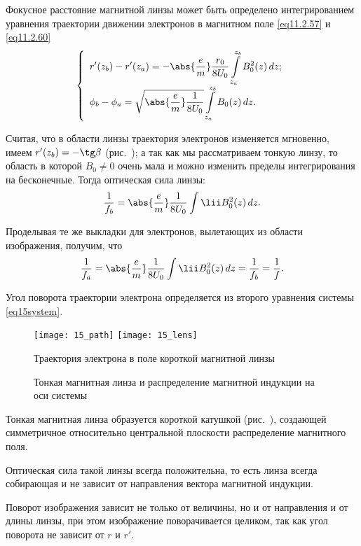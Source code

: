 
Фокусное расстояние магнитной линзы может быть определено интегрированием
уравнения траектории движении электронов в магнитном поле \eqref{eq11.2.57} и
\eqref{eq11.2.60}
\begin{equation}
  \left\{
    \begin{array}{l}
      \displaystyle r'(z_b) - r'(z_a) = -\abs{\frac{e}{m}}\frac{r_0}{8U_0}
        \int\limits_{z_a}^{z_b} B_0^2(z)\,dz; \\
      \displaystyle \phi_b - \phi_a = \sqrt{\abs{\frac{e}{m}}\frac{1}{8U_0}}
        \int\limits_{z_a}^{z_b} B_0(z)\,dz.
    \end{array}
  \right.
  \label{eq15system}
\end{equation}

Считая, что в области линзы траектория электронов изменяется мгновенно, имеем
\( r'(z_b) = -\tg\beta \) (рис.~); а так как мы рассматриваем тонкую
линзу, то область в которой \( B_0 \ne 0 \) очень мала и можно изменить пределы
интегрирования на бесконечные. Тогда оптическая сила линзы:
\[
  \frac{1}{f_b} = \abs{\frac{e}{m}}\frac{1}{8U_0} \int\lii B_0^2(z)\,dz.
\]

Проделывая те же выкладки для электронов, вылетающих из области изображения,
получим, что
\[
  \frac{1}{f_a} = \abs{\frac{e}{m}}\frac{1}{8U_0} \int\lii B_0^2(z)\,dz =
    \frac{1}{f_b} = \frac{1}{f}.
\]

Угол поворота траектории электрона определяется из второго уравнения системы
\eqref{eq15system}.

\begin{figure}[h!]
  \center
  \texttt{[image: 15\_path]} \hspace{1em}
  \texttt{[image: 15\_lens]} \\
  \parbox{.5\textwidth}{\caption{Траектория электрона в поле короткой магнитной
    линзы} \label{pic15path}} \hspace{1em}
  \parbox{.35\textwidth}{\caption{Тонкая магнитная линза и распределение
    магнитной индукции на оси системы} \label{pic15lens}}
\end{figure}

Тонкая магнитная линза образуется короткой катушкой (рис.~),
создающей симметричное относительно центральной плоскости распределение
магнитного поля.

Оптическая сила такой линзы всегда положительна, то есть линза всегда собирающая
и не зависит от направления вектора магнитной индукции.

Поворот изображения зависит не только от величины, но и от направления и от
длины линзы, при этом изображение поворачивается целиком, так как угол поворота
не зависит от \( r \) и \( r' \).
